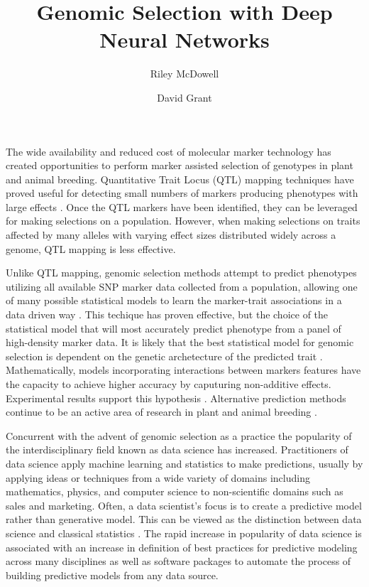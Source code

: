 \documentclass[9pt,twocolumn,twoside]{g3_article/gsag3jnl}
\title{Genomic Selection with Deep Neural Networks}
\author[$\ast$,1]{Riley McDowell}
\author[$\dagger$]{David Grant}
\affil[$\ast$]{Iowa State University, US}
\affil[$\dagger$]{Iowa State University, US}
\begin{document}
\maketitle
\thispagestyle{firststyle}
\logomark
\articletypemark
\marginmark
\firstpagefootnote
{}
\vspace{-11pt}

\noindent %

The wide availability and reduced cost of molecular marker technology
has created opportunities to perform marker assisted selection of genotypes
in plant and animal breeding. Quantitative Trait Locus (QTL) mapping techniques
have proved useful for detecting small numbers of markers producing 
phenotypes with large effects \citep{miles2008}. Once the QTL 
markers have been identified, they can be leveraged for making selections
on a population. However, when making selections on traits affected by many 
alleles with varying effect sizes distributed widely across a genome, 
QTL mapping is less effective. 

Unlike QTL mapping, genomic selection methods attempt to predict phenotypes 
utilizing all available SNP marker data collected from a population,
allowing one of many possible statistical models to learn the marker-trait 
associations in a data driven way \citep{meuwissen2001}. This techique has
proven effective, but the choice of the statistical model that will most
accurately predict phenotype from a panel of high-density marker data. It is likely 
that the best statistical model for genomic selection is dependent on the genetic 
archetecture of the predicted trait \citep{crossa2010, gonzalez-camacho2012, 
resende2012, cleveland2012, thavamanikumar2015}.  Mathematically, models incorporating 
interactions between markers features have the capacity to achieve higher accuracy 
by caputuring non-additive effects. Experimental results support this 
hypothesis \citep{gonzalez-camacho2012}. Alternative prediction methods continue 
to be an active area of research in plant and animal breeding \citep{koning2012}.

Concurrent with the advent of genomic selection as a practice the popularity of the 
interdisciplinary field known as data science has increased. Practitioners of data 
science apply machine learning and statistics to make predictions, usually
by applying ideas or techniques from a wide variety of domains 
including mathematics, physics, and computer science to non-scientific 
domains such as sales and marketing. Often, a data scientist's focus is to
create a predictive model rather than generative model. This can be viewed 
as the distinction between data science and classical statistics 
\citep{donoho2015, brieman2001}. The rapid increase in popularity of data science
is associated with an increase in definition of best practices for predictive modeling
across many disciplines as well as software packages to automate the 
process of building predictive models from any data source.
\end{document}
